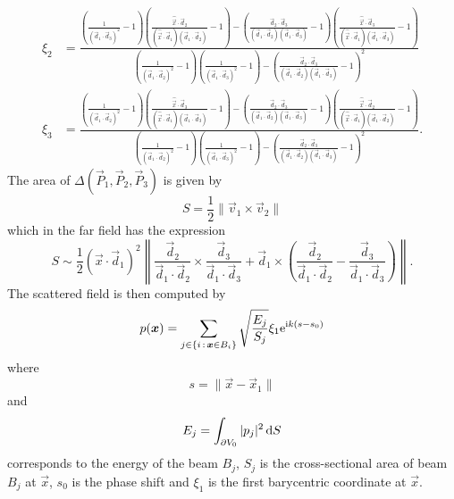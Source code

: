 \begin{align*}
	\xi_2 &= \frac{\left(\frac{1}{(\vec{d}_1\cdot \vec{d}_3)^2} - 1\right)\left(\frac{\hat{\vec{x}}\cdot\vec{d}_2}{(\hat{\vec{x}}\cdot\vec{d}_1)(\vec{d}_1\cdot \vec{d}_2)}-1\right)-\left(\frac{\vec{d}_2\cdot\vec{d}_3}{(\vec{d}_1\cdot \vec{d}_2)(\vec{d}_1\cdot \vec{d}_3)} - 1\right)\left(\frac{\hat{\vec{x}}\cdot\vec{d}_3}{(\hat{\vec{x}}\cdot\vec{d}_1)(\vec{d}_1\cdot \vec{d}_3)}-1\right)}{\left(\frac{1}{(\vec{d}_1\cdot \vec{d}_2)^2} - 1\right)\left(\frac{1}{(\vec{d}_1\cdot \vec{d}_3)^2} - 1\right)-\left(\frac{\vec{d}_2\cdot\vec{d}_3}{(\vec{d}_1\cdot \vec{d}_2)(\vec{d}_1\cdot \vec{d}_3)} - 1\right)^2}\\
	\xi_3 &= \frac{\left(\frac{1}{(\vec{d}_1\cdot \vec{d}_2)^2} - 1\right)\left(\frac{\hat{\vec{x}}\cdot\vec{d}_3}{(\hat{\vec{x}}\cdot\vec{d}_1)(\vec{d}_1\cdot \vec{d}_3)}-1\right)-\left(\frac{\vec{d}_2\cdot\vec{d}_3}{(\vec{d}_1\cdot \vec{d}_2)(\vec{d}_1\cdot \vec{d}_3)} - 1\right)\left(\frac{\hat{\vec{x}}\cdot\vec{d}_2}{(\hat{\vec{x}}\cdot\vec{d}_1)(\vec{d}_1\cdot \vec{d}_2)}-1\right)}{\left(\frac{1}{(\vec{d}_1\cdot \vec{d}_2)^2} - 1\right)\left(\frac{1}{(\vec{d}_1\cdot \vec{d}_3)^2} - 1\right)-\left(\frac{\vec{d}_2\cdot\vec{d}_3}{(\vec{d}_1\cdot \vec{d}_2)(\vec{d}_1\cdot \vec{d}_3)} - 1\right)^2}.
\end{align*}
The area of $\Delta(\vec{P}_1,\vec{P}_2,\vec{P}_3)$ is given by
\begin{equation*}
	S = \frac{1}{2}\|\vec{v}_1\times\vec{v}_2\|
\end{equation*}
which in the far field has the expression
\begin{equation*}
	S \sim \frac{1}{2}(\vec{x}\cdot\vec{d}_1)^2\left\|\frac{\vec{d}_2}{\vec{d}_1\cdot\vec{d}_2}\times\frac{\vec{d}_3}{\vec{d}_1\cdot\vec{d}_3}+\vec{d}_1\times\left(\frac{\vec{d}_2}{\vec{d}_1\cdot\vec{d}_2}-\frac{\vec{d}_3}{\vec{d}_1\cdot\vec{d}_3}\right)\right\|.
\end{equation*}
The scattered field is then computed by
\begin{equation*}
	p(\vec{x}) = \sum_{j\in\{i\st \vec{x}\in B_i\}} \sqrt{\frac{E_j}{S_j}}\xi_1 \euler^{\imag k (s-s_0)}
\end{equation*}
where
\begin{equation*}
	s=\|\vec{x}-\vec{x}_1\|
\end{equation*}
and
\begin{equation*}
	E_j = \int_{\partial V_0} |p_j|^2\, \mathrm{d} S
\end{equation*}
corresponds to the energy of the beam $B_j$, $S_j$ is the cross-sectional area of beam $B_j$ at $\vec{x}$, $s_0$ is the phase shift and $\xi_1$ is the first barycentric coordinate at $\vec{x}$.


